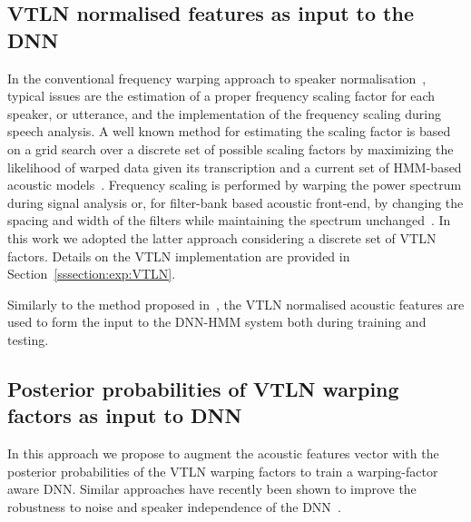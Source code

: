 \documentclass{nle}
\begin{document}
\subsection{VTLN normalised features as input to the DNN}
In   the   conventional   frequency   warping  approach   to   speaker
normalisation~\citep{EidGis96,LeeRos96,WegMcaOrlPek96},  typical issues
are  the estimation  of a  proper  frequency scaling  factor for  each
speaker, or utterance, and the implementation of the frequency scaling
during  speech  analysis.  A  well  known  method  for estimating  the
scaling  factor is  based on  a  grid search  over a  discrete set  of
possible scaling  factors by maximizing the likelihood  of warped data
given  its transcription and a  current set  of  HMM-based acoustic  models~\citep{LeeRos96}.
Frequency scaling  is performed by  warping the power  spectrum during
signal  analysis  or, for  filter-bank  based  acoustic front-end,  by
changing the  spacing and width  of the filters while  maintaining the
spectrum  unchanged~\citep{LeeRos96}.   In  this  work we  adopted  the
latter approach considering a discrete set of VTLN factors. Details on the VTLN implementation  are provided in
Section~\ref{sssection:exp:VTLN}.

Similarly to the method proposed in~\citet{seide11}, the VTLN normalised
acoustic features are used to form the input to the DNN-HMM system both
during training and testing.

\subsection{Posterior probabilities of VTLN warping factors as input to DNN}
In this  approach we propose  to augment the acoustic  features vector
with the posterior probabilities of  the VTLN warping factors to train
a warping-factor  aware DNN.   Similar approaches have  recently been
shown  to  improve the  robustness  to noise and  speaker  independence of  the
DNN~\citep{export:194344,42536}.
\end{document}
